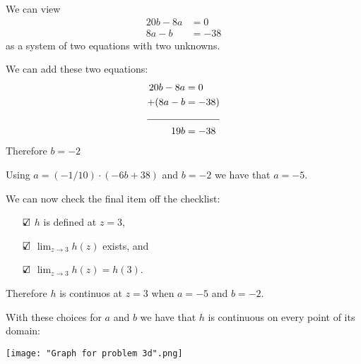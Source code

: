 \documentclass{article}
\theoremstyle{definition}
\begin{document}
\begin{Solution}
  We can view
  \begin{align*}
    20b - 8a &= 0 \\
    8a - b  &= -38
  \end{align*}
  as a system of two equations with two unknowns.

  We can add these two equations:
  \begin{align*}
     20b - 8a &= 0 \\
   + (8a - b  &= -38)\\
     \cline{1-2}
    19b &= -38
  \end{align*}
  Therefore $b = -2$

  Using $a = (-1/10) \cdot (-6b + 38)$ and $b = -2$ we have that $a = -5$.

  We can now check the final item off the checklist:
  \begin{itemize}
    \item[$\text{\rlap{$\checkmark$}}\square$]
      $h$ is defined at $z = 3$,

    \item[$\text{\rlap{$\checkmark$}}\square$]
      $\lim_{z \to 3} h(z)$ exists, and

    \item[$\text{\rlap{$\checkmark$}}\square$]  
      $\lim_{z \to 3} h(z) = h(3)$.
  \end{itemize}
  
  Therefore $h$ is continuos at $z = 3$ when $a = -5$ and $b = -2$.

  With these choices for $a$ and $b$ we have that $h$ is continuous on every point of its domain:
  \begin{center}
    \texttt{[image: "Graph for problem 3d".png]}
  \end{center}
\end{Solution}
\end{document}
